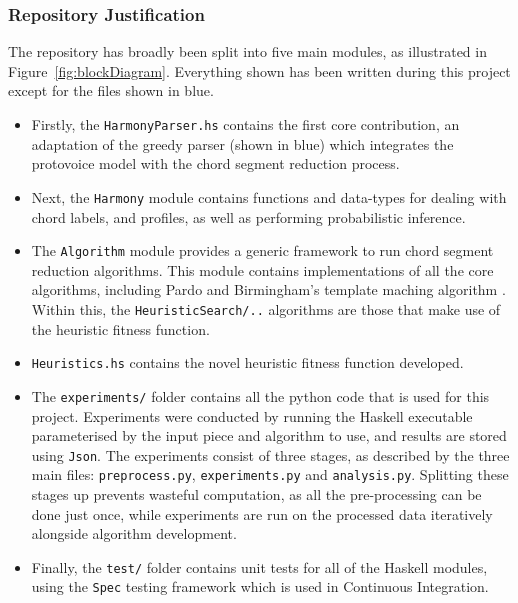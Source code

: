 \documentclass[12pt,a4paper,twoside,openany]{report} \usepackage[pdfborder={0 0 0}]{hyperref}    %
\theoremstyle{definition} \newtheorem{definition}{Definition}[section]
\begin{document}
    \FloatBarrier
    \subsubsection{Repository Justification}

    The repository has broadly been split into five main modules, as illustrated in Figure~\ref{fig:blockDiagram}.
    Everything shown has been written during this project except for the files shown in blue.
    \begin{itemize} 
      \item Firstly, the \texttt{HarmonyParser.hs} contains the first core contribution, an adaptation of the greedy
        parser (shown in blue) which integrates the protovoice model with the chord segment reduction process.
      \item Next, the \texttt{Harmony} module contains functions and data-types for dealing with chord labels, and
        profiles, as well as performing probabilistic inference. 
      \item The \texttt{Algorithm} module provides a generic framework to run chord segment reduction algorithms. This
        module contains implementations of all the core algorithms, including Pardo and Birmingham's template maching
        algorithm \cite{pardoAlgorithmsChordalAnalysis2002}. Within this, the \texttt{HeuristicSearch/..} algorithms are
        those that make use of the heuristic fitness function.
      \item \texttt{Heuristics.hs} contains the novel heuristic fitness function developed. 
      \item The \texttt{experiments/} folder contains all the python code that is used for this project. Experiments
        were conducted by running the Haskell executable parameterised by the input piece and algorithm to use, and
        results are stored using \texttt{Json}. The experiments consist of three stages, as described by the three main files: \texttt{preprocess.py}, \texttt{experiments.py} and \texttt{analysis.py}. 
        Splitting these stages up prevents wasteful computation, as all the pre-processing can be done just once, while experiments are run on the processed data iteratively alongside algorithm development. 
      \item Finally, the \texttt{test/} folder contains unit tests for all of the Haskell modules, using the
        \texttt{Spec} testing framework which is used in Continuous Integration. 
    \end{itemize}
\end{document}
